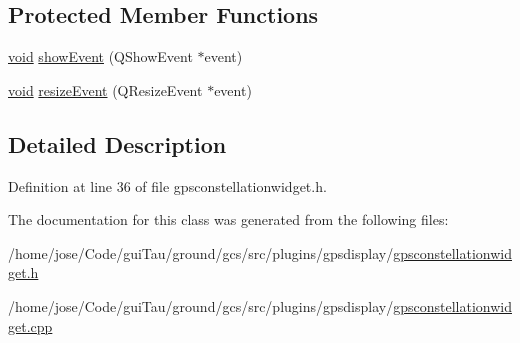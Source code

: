 \subsection*{Protected Member Functions}
\begin{DoxyCompactItemize}
\item 
\hyperlink{group___u_a_v_objects_plugin_ga444cf2ff3f0ecbe028adce838d373f5c}{void} \hyperlink{group___g_p_s_gadget_plugin_ga6b206d00a88aa90134aba5ca815355a9}{show\-Event} (Q\-Show\-Event $\ast$event)
\item 
\hyperlink{group___u_a_v_objects_plugin_ga444cf2ff3f0ecbe028adce838d373f5c}{void} \hyperlink{group___g_p_s_gadget_plugin_ga33f2f0f0eba2737a2917b206fda14a11}{resize\-Event} (Q\-Resize\-Event $\ast$event)
\end{DoxyCompactItemize}


\subsection{Detailed Description}


Definition at line 36 of file gpsconstellationwidget.\-h.



The documentation for this class was generated from the following files\-:\begin{DoxyCompactItemize}
\item 
/home/jose/\-Code/gui\-Tau/ground/gcs/src/plugins/gpsdisplay/\hyperlink{gpsconstellationwidget_8h}{gpsconstellationwidget.\-h}\item 
/home/jose/\-Code/gui\-Tau/ground/gcs/src/plugins/gpsdisplay/\hyperlink{gpsconstellationwidget_8cpp}{gpsconstellationwidget.\-cpp}\end{DoxyCompactItemize}
